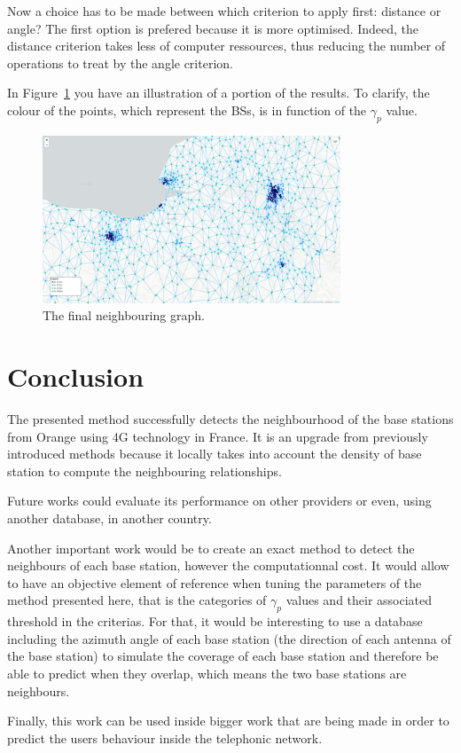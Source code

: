 \documentclass[lettersize,journal,english]{IEEEtran}
\begin{document}
        Now a choice has to be made between which criterion to apply first: distance or angle? The first option is prefered because it is more optimised. Indeed, the distance criterion takes less of computer ressources, thus reducing the number of operations to treat by the angle criterion.

        In Figure~\ref{fig:final_neighs} you have an illustration of a portion of the results. To clarify, the colour of the points, which represent the BSs, is in function of the $\gamma_p$ value.

        \begin{figure}
            \centering
            \includegraphics[width=3.5in]{images/illus_graphs/final_neighs_del_da.png}
            \caption{The final neighbouring graph.}
            \label{fig:final_neighs}
        \end{figure}

\section{Conclusion\label{sec:ccl}}
    The presented method successfully detects the neighbourhood of the base stations from Orange using 4G technology in France. It is an upgrade from previously introduced methods because it locally takes into account the density of base station to compute the neighbouring relationships.
    
    Future works could evaluate its performance on other providers or even, using another database, in another country.

    Another important work would be to create an exact method to detect the neighbours of each base station, however the computationnal cost. It would allow to have an objective element of reference when tuning the parameters of the method presented here, that is the categories of $\gamma_p$ values and their associated threshold in the criterias. For that, it would be interesting to use a database including the azimuth angle of each base station (the direction of each antenna of the base station) to simulate the coverage of each base station and therefore be able to predict when they overlap, which means the two base stations are neighbours.

    Finally, this work can be used inside bigger work that are being made in order to predict the users behaviour inside the telephonic network.



\end{document}
